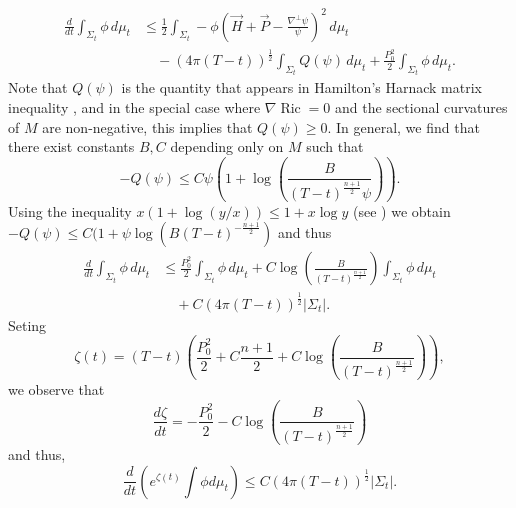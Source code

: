 \documentclass[11pt]{amsart}
\DeclareMathOperator{\Ric}{Ric}    \DeclareMathOperator{\Rm}{Rm}
\def\dmt{\,d\mu_t}
\def\a{\alpha}
\begin{document}
\[\begin{split}
\frac{d}{dt}\int_{\Sigma_t}\phi\dmt &\le  \frac12\int_{\Sigma_t}-\phi\left(\vec H+\vec P-\frac{\nabla^\bot \psi}{\psi}\right)^2\dmt\\
&\quad- (4\pi (T-t))^\frac12\int_{\Sigma_t}Q(\psi)\dmt+\frac{P_0^2}{2}\int_{\Sigma_t}\phi\dmt.
\end{split}\]
Note that $Q(\psi)$ is the quantity that appears in Hamilton's Harnack matrix inequality \cite{Ha}, and in the special case where $\nabla \Ric=0$ and the sectional curvatures of $M$ are non-negative, this implies that $Q(\psi)\ge 0$.  In general, we find that there exist constants $B,C$ depending only on $M$ such that
\[-Q(\psi)\le C\psi\left(1+\log\left(\frac{B}{(T-t)^\frac{n+1}{2} \psi}\right)\right).\]
Using the inequality $x(1+\log(y/x))\le 1+x\log y$ (see \cite{Ha1}) we obtain
$-Q(\psi)\le C(1+\psi\log (B(T-t)^{-\frac{n+1}{2}})$ and thus
\[\begin{split}
\frac{d}{dt}\int_{\Sigma_t}\phi\dmt &\le\frac{P_0^2}{2}\int_{\Sigma_t}\phi\dmt + C\log \left(\frac{B}{(T-t)^{\frac{n+1}{2}}}\right)\int_{\Sigma_t}\phi\dmt\\
&\quad+C(4\pi (T-t))^\frac12|\Sigma_t|.
\end{split}\]
Seting
\[\zeta(t)=(T-t)\left(\frac{P_0^2}{2}+C\frac{n+1}{2}+C\log \left(\frac{B}{(T-t)^{\frac{n+1}{2}}}\right)\right), \]
we observe that 
\[\frac{d\zeta}{dt}=-\frac{P_0^2}{2}-C\log \left(\frac{B}{(T-t)^{\frac{n+1}{2}}}\right)\]
and thus, 
\[\frac{d}{dt}\left(e^{\zeta(t)}\int\phi d\mu_t\right)\le C(4\pi (T-t))^\frac12|\Sigma_t|.\]








\end{document}
